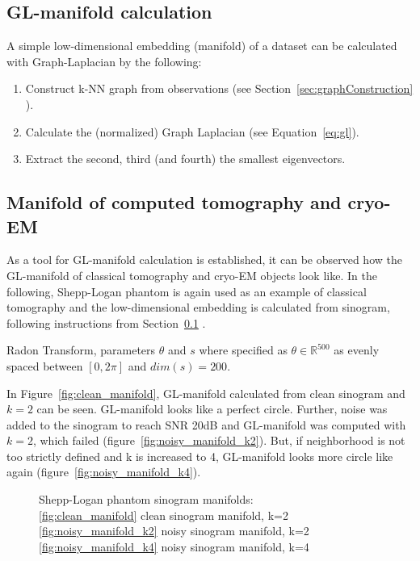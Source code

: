 \subsection{GL-manifold calculation}
\label{sec:manifold_calculation}
A simple low-dimensional embedding (manifold) of a dataset can be calculated with Graph-Laplacian 
by the following:

\begin{enumerate}
    \item Construct k-NN graph from observations (see Section~\ref{sec:graphConstruction} \textit{}).
    \item Calculate the (normalized) Graph Laplacian (see Equation~\ref{eq:gl}).
    \item Extract the second, third (and fourth) the smallest eigenvectors.
\end{enumerate}

\subsection{Manifold of computed tomography and cryo-EM}
\label{sec:manifold_ct_cryoEM}
As a tool for GL-manifold calculation is established, it can be observed how the GL-manifold of classical tomography and cryo-EM objects look like.
In the following, Shepp-Logan phantom is again used as an example of classical tomography
and the low-dimensional embedding is calculated from sinogram, following instructions from 
Section~\ref{sec:manifold_calculation} \textit{}.

Radon Transform, parameters $\theta$ and $s$ where specified as $\theta \in \mathbb{R}^{500}$ as evenly spaced
between $[0, 2 \pi]$ and $dim(s) = 200$. 

In Figure~\ref{fig:clean_manifold}, GL-manifold calculated from clean sinogram and $k=2$ can be seen.
GL-manifold looks like a perfect circle. Further, noise was added to the sinogram 
to reach SNR 20dB and GL-manifold was computed with $k=2$, which failed (figure~\ref{fig:noisy_manifold_k2}).
But, if neighborhood is not too strictly defined and k is increased to 4, GL-manifold looks more circle like again
(figure~\ref{fig:noisy_manifold_k4}).

\begin{figure}[H]
    \centering
    \hfill
        \hfill
    \hfill
    \hfill
    \caption{Shepp-Logan phantom sinogram manifolds: \\
    \ref{fig:clean_manifold} clean sinogram manifold, k=2 \\
    \ref{fig:noisy_manifold_k2} noisy sinogram manifold, k=2 \\
    \ref{fig:noisy_manifold_k4} noisy sinogram manifold, k=4
    }
\end{figure}

